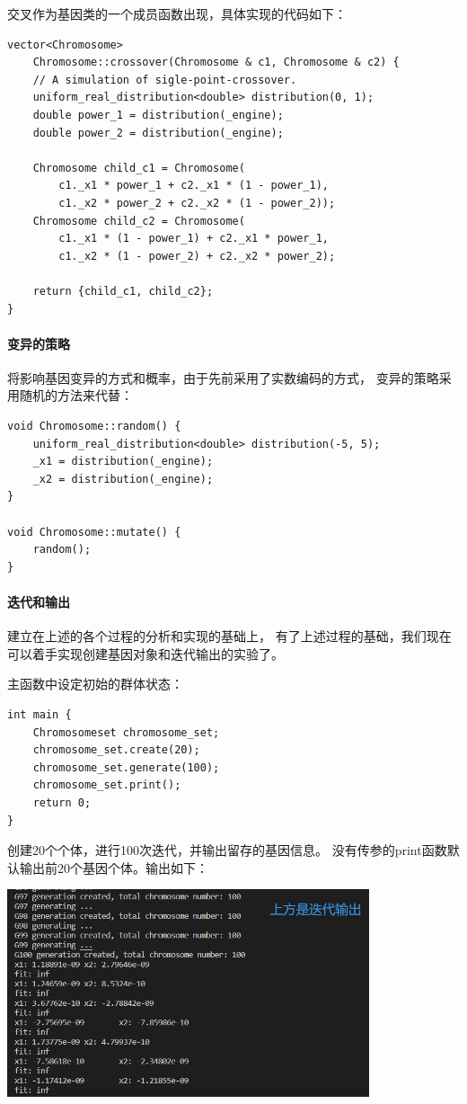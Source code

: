 \documentclass[UTF8]{ctexart}
\begin{document}
交叉作为基因类的一个成员函数出现，具体实现的代码如下：

\begin{lstlisting}
vector<Chromosome>
    Chromosome::crossover(Chromosome & c1, Chromosome & c2) {
    // A simulation of sigle-point-crossover.
    uniform_real_distribution<double> distribution(0, 1);
    double power_1 = distribution(_engine);
    double power_2 = distribution(_engine);

    Chromosome child_c1 = Chromosome(
        c1._x1 * power_1 + c2._x1 * (1 - power_1),
        c1._x2 * power_2 + c2._x2 * (1 - power_2));
    Chromosome child_c2 = Chromosome(
        c1._x1 * (1 - power_1) + c2._x1 * power_1,
        c1._x2 * (1 - power_2) + c2._x2 * power_2);

    return {child_c1, child_c2};
}
\end{lstlisting}

\paragraph{变异的策略}
将影响基因变异的方式和概率，由于先前采用了实数编码的方式，
变异的策略采用随机的方法来代替：

\begin{lstlisting}
void Chromosome::random() {
    uniform_real_distribution<double> distribution(-5, 5);
    _x1 = distribution(_engine);
    _x2 = distribution(_engine);
}

void Chromosome::mutate() {
    random();
}
\end{lstlisting}

\paragraph{迭代和输出}
建立在上述的各个过程的分析和实现的基础上，
有了上述过程的基础，我们现在可以着手实现创建基因对象和迭代输出的实验了。

主函数中设定初始的群体状态：

\begin{lstlisting}
int main {
    Chromosomeset chromosome_set;
    chromosome_set.create(20);
    chromosome_set.generate(100);
    chromosome_set.print();
    return 0;
}
\end{lstlisting}

创建20个个体，进行100次迭代，并输出留存的基因信息。
没有传参的print函数默认输出前20个基因个体。输出如下：

\includegraphics[width = 0.8\textwidth]{output_01.png}
\end{document}
